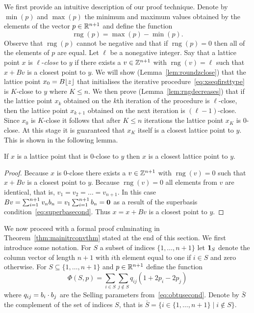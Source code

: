 \documentclass[final,leqno]{siamltex}
\begin{document}
\newcommand{\rng}{\operatorname{rng}}

We first provide an intuitive description of our proof technique.  Denote by $\min(p)$ and $\max(p)$ the minimum and maximum values obtained by the elements of the vector $p \in {\mathbb R}^{n+1}$ and define the function
\[
\rng(p) = \max(p) - \min(p).
\] 
Observe that $\rng(p)$ cannot be negative and that if $\rng(p) = 0$ then all of the elements of $p$ are equal.  Let $\ell$ be a nonegative integer.  Say that a lattice point $x$ is $\ell$-\emph{close} to $y$ if there exists a $v \in {\mathbb Z}^{n+1}$ with $\rng(v) = \ell$ such that $x + Bv$ is a closest point to $y$.  We will show (Lemma~\ref{lem:roundzclose}) that the lattice point $x_0 = B{\left\lfloor z \right\rfloor}$ that initialises the iterative procedure~\eqref{eq:xseqfirsttype} is $K$-close to $y$ where $K \leq n$.  We then prove (Lemma~\ref{lem:rngdecreases}) that if the lattice point $x_k$ obtained on the $k$th iteration of the procedure is $\ell$-close, then the lattice point $x_{k+1}$ obtained on the next iteration is $(\ell-1)$-close.  Since $x_0$ is $K$-close it follows that after $K \leq n$ iterations the lattice point $x_K$ is $0$-close.  At this stage it is guaranteed that $x_{K}$ itself is a closest lattice point to $y$.  This is shown in the following lemma.

\begin{lemma}\label{lem:rngzeroclosestpoint}
If $x$ is a lattice point that is $0$-close to $y$ then $x$ is a closest lattice point to $y$.
\end{lemma}
\begin{proof}
Because $x$ is $0$-close there exists a $v \in {\mathbb Z}^{n+1}$ with $\rng(v) = 0$ such that $x + Bv$ is a closest point to $y$.  Because $\rng(v) = 0$ all elements from $v$ are identical, that is, $v_1=v_2=\dots=v_{n+1}$.  In this case $Bv = \sum_{i=1}^{n+1} v_n b_n = v_1\sum_{i=1}^{n+1}b_n = \boldsymbol{0}$
as a result of the superbasis condition~\eqref{eq:superbasecond}.  Thus $x = x + Bv$ is a closest point to $y$. 
\end{proof}

\newcommand{\subrng}{\operatorname{subr}}
\newcommand{\decrng}{\operatorname{decrng}}

We now proceed with a formal proof culminating in Theorem~\ref{thm:mainitrconvthm} stated at the end of this section.  We first introduce some notation.  For $S$ a subset of indices $\{1,\dots,n+1\}$ let $\boldsymbol{1}_S$ denote the column vector of length $n+1$ with $i$th element equal to one if $i \in S$ and zero otherwise. %
For $S \subseteq \{1,\dots,n+1\}$ and $p \in {\mathbb R}^{n+1}$ define the function
\[
\Phi(S, p) = \sum_{i \in S}\sum_{j \notin S}q_{ij}(1 + 2p_i - 2p_j)
\]
where $q_{ij} = b_i \cdot b_j$ are the Selling parameters from~\eqref{eq:obtusecond}.  Denote by $\bar{S}$ the complement of the set of indices $S$, that is $\bar{S} = \{ i \in \{1,\dots,n+1\} \mid i \notin S\}$. 
\end{document}
